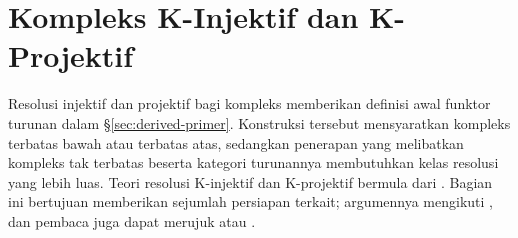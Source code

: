 
\section{Kompleks K-Injektif dan K-Projektif}\label{sec:K-injectives}
\hypertarget{o014.aljabr2.chapter3.k-injectives}{ }

Resolusi injektif dan projektif bagi kompleks memberikan definisi awal
funktor turunan dalam \S\ref{sec:derived-primer}. Konstruksi tersebut
mensyaratkan kompleks terbatas bawah atau terbatas atas, sedangkan penerapan
yang melibatkan kompleks tak terbatas beserta kategori turunannya membutuhkan
kelas resolusi yang lebih luas. Teori resolusi K-injektif dan K-projektif
bermula dari \cite{Spa88}. Bagian ini bertujuan memberikan sejumlah
persiapan terkait; argumennya mengikuti \cite{stacks}, dan pembaca juga dapat
merujuk \cite[Bab 14]{KS06} atau \cite{BN93}.

